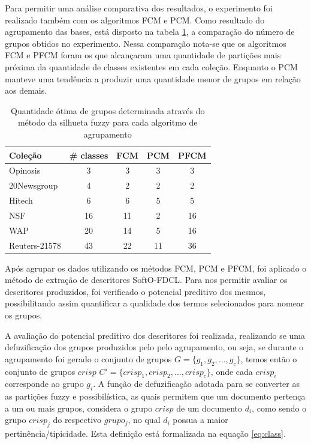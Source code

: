 Para permitir uma análise comparativa dos resultados, o experimento foi realizado também com os
algoritmos FCM e PCM.
Como resultado do agrupamento das bases, está disposto na tabela \ref{table:pfcmclusters}, a
comparação do número de grupos obtidos no experimento. Nessa comparação nota-se que os algoritmos
FCM e PFCM foram os que alcançaram uma quantidade de partições mais próxima da quantidade de classes
existentes em cada coleção. Enquanto o PCM manteve uma tendência a produzir uma quantidade menor de
grupos em relação aos demais.

\begin{table}[!htp]
  \centering
  \begin{tabular}{ |l|c|c|c|c|}
    \hline
    {\bf Coleção} & {\bf \# classes} & {\bf FCM} & {\bf PCM} & {\bf PFCM} \\
    \hline
    Opinosis & 3 & 3 & 3 & 3 \\
    \hline
    20Newsgroup & 4 & 2 & 2 & 2 \\
    \hline
    Hitech & 6 & 6 & 5 & 5 \\
    \hline
    NSF & 16 & 11 & 2 & 16 \\
    \hline
    WAP & 20 & 14 & 5 & 16 \\
    \hline
    Reuters-21578 & 43 & 22 & 11 & 36 \\
    \hline
  \end{tabular}
  \caption{Quantidade ótima de grupos determinada através do método da silhueta fuzzy para cada
  algoritmo de agrupamento}
  \label{table:pfcmclusters}
\end{table}

Após agrupar os dados utilizando os métodos FCM, PCM e PFCM, foi aplicado o método de extração 
de descritores SoftO-FDCL. Para nos permitir avaliar os descritores produzidos, foi verificado o
potencial preditivo dos mesmos, possibilitando assim quantificar a qualidade dos
termos selecionados para nomear os grupos. 

A avaliação do potencial preditivo dos descritores foi realizada, realizando se uma defuzificação
dos grupos produzidos pelo pelo agrupamento, ou seja, se durante o agrupamento foi gerado o conjunto
de grupos $G = \{g_1,g_2,...,g_c\}$, temos então o conjunto de grupos $crisp$ $C' =
\{crisp_1,crisp_2,...,crisp_c\}$, onde cada $crisp_i$ corresponde ao grupo $g_i$. A função de
defuzificação adotada para se converter as
as partições fuzzy e possibilística, as quais permitem que um documento pertença a um ou mais
grupos, considera o grupo $crisp$ de um documento $d_i$, como sendo o grupo $crisp_j$ do respectivo
$grupo_j$, no qual $d_i$ possua a maior
pertinência/tipicidade. Esta definição está formalizada na equação \ref{eq:class}.

